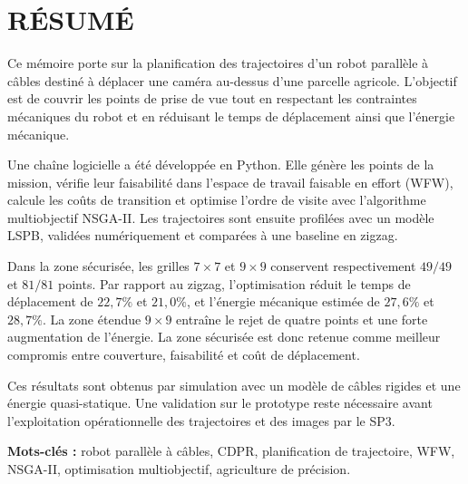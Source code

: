 \chapter*{RÉSUMÉ}
\thispagestyle{plain}
\setlength{\parskip}{0.45em}

Ce mémoire porte sur la planification des trajectoires d'un robot parallèle à câbles destiné à déplacer une caméra au-dessus d'une parcelle agricole. L'objectif est de couvrir les points de prise de vue tout en respectant les contraintes mécaniques du robot et en réduisant le temps de déplacement ainsi que l'énergie mécanique.

Une chaîne logicielle a été développée en Python. Elle génère les points de la mission, vérifie leur faisabilité dans l'espace de travail faisable en effort (WFW), calcule les coûts de transition et optimise l'ordre de visite avec l'algorithme multiobjectif NSGA-II. Les trajectoires sont ensuite profilées avec un modèle LSPB, validées numériquement et comparées à une baseline en zigzag.

Dans la zone sécurisée, les grilles $7\times7$ et $9\times9$ conservent respectivement $49/49$ et $81/81$ points. Par rapport au zigzag, l'optimisation réduit le temps de déplacement de $22{,}7\%$ et $21{,}0\%$, et l'énergie mécanique estimée de $27{,}6\%$ et $28{,}7\%$. La zone étendue $9\times9$ entraîne le rejet de quatre points et une forte augmentation de l'énergie. La zone sécurisée est donc retenue comme meilleur compromis entre couverture, faisabilité et coût de déplacement.

Ces résultats sont obtenus par simulation avec un modèle de câbles rigides et une énergie quasi-statique. Une validation sur le prototype reste nécessaire avant l'exploitation opérationnelle des trajectoires et des images par le SP3.

\vspace{0.25cm}
\textbf{Mots-clés :} robot parallèle à câbles, CDPR, planification de trajectoire, WFW, NSGA-II, optimisation multiobjectif, agriculture de précision.
